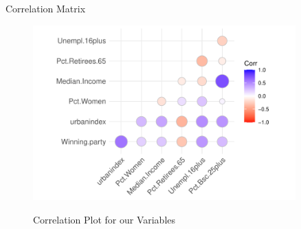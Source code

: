 \documentclass{beamer}
\begin{document}
\begin{frame}{Correlation Matrix}
\begin{figure}
    \centering
    \caption{Correlation Plot for our Variables}
    \includegraphics[width=0.9\textwidth]{plots/corrplot.pdf}
    \label{fig:enter-label}
\end{figure}
\end{frame}









\end{document}
